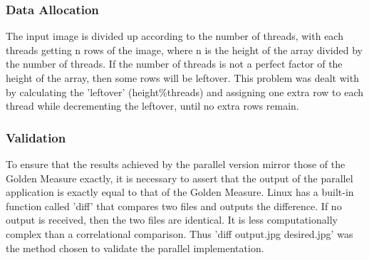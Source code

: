\subsubsection{Data Allocation}
The input image is divided up according to the number of threads, with each threads getting n rows of the image, where n is the height of the array divided by the number of threads. If the number of threads is not a perfect factor of the height of the array, then some rows will be leftover. This problem was dealt with by calculating the 'leftover' (height\%threads) and assigning one extra row to each thread while decrementing the leftover, until no extra rows remain.

 
\subsubsection{Validation}
To ensure that the results achieved by the parallel version mirror those of the Golden Measure exactly, it is necessary to assert that the output of the parallel application is exactly equal to that of the Golden Measure. Linux has a built-in function called 'diff' that compares two files and outputs the difference. If no output is received, then the two files are identical. It is less computationally complex than a correlational comparison. Thus 'diff output.jpg desired.jpg' was the method chosen to validate the parallel implementation. 


%
%
%
